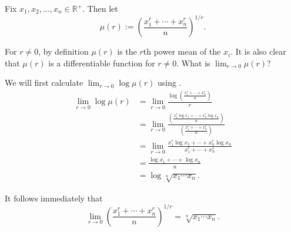 \documentclass[12pt]{article}
\begin{document}
Fix $x_1, x_2, \ldots, x_n \in \mathbb{R}^+$.  Then let 
\[
\mu(r) := \left(\frac{x_1^r+\cdots+x_n^r}{n}\right)^{1/r}.
\]

For $r\neq 0$, by definition $\mu(r)$ is the $r$th power mean of the $x_i$.  It is also clear that $\mu(r)$ is a differentiable function for $r\neq 0$.  What is $\lim_{r\to 0} \mu(r)$?  

We will first calculate $\lim_{r\to 0} \log\mu(r)$ using .
\begin{align*}
\lim_{r\to 0} \log\mu(r) & = \lim_{r\to 0} \frac{\log\left(\frac{x_1^r+\cdots +x_n^r}{n}\right)}{r}\\
& = \lim_{r\to 0} \frac{\left(\frac{x_1^r\log x_1+\cdots+x_n^r\log x_n}{n}\right)}{\left(\frac{x_1^r+\cdots+x_n^r}{n}\right)}\\
& = \lim_{r\to 0} \frac{x_1^r\log x_1+\cdots+x_n^r\log x_n}{x_1^r+\cdots+x_n^r}\\
& = \frac{\log x_1+\cdots+\log x_n}{n}\\
& = \log \sqrt[n]{x_1\cdots x_n}.
\end{align*}

It follows immediately that 
\[
\lim_{r\to 0} \left(\frac{x_1^r+\cdots+x_n^r}{n}\right)^{1/r} = \sqrt[n]{x_1\cdots x_n}.
\]
\end{document}
